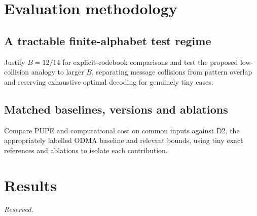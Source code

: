 \documentclass[10pt,a4paper]{article}
\begin{document}
\section{Evaluation methodology}

\subsection{A tractable finite-alphabet test regime}
Justify $B=12/14$ for explicit-codebook comparisons and test the proposed low-collision analogy to larger $B$, separating message collisions from pattern overlap and reserving exhaustive optimal decoding for genuinely tiny cases.

\subsection{Matched baselines, versions and ablations}
Compare PUPE and computational cost on common inputs against D2, the appropriately labelled ODMA baseline and relevant bounds, using tiny exact references and ablations to isolate each contribution.

\section{Results}
\emph{Reserved.}
\end{document}
